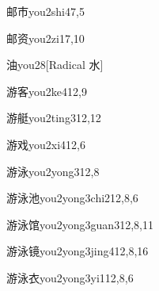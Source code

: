 \begin{verbete}{邮市}{you2shi4}{7,5}
\end{verbete}

\begin{verbete}{邮资}{you2zi1}{7,10}
\end{verbete}

\begin{verbete}{油}{you2}{8}[Radical 水]
\end{verbete}

\begin{verbete}{游客}{you2ke4}{12,9}
\end{verbete}

\begin{verbete}{游艇}{you2ting3}{12,12}
\end{verbete}

\begin{verbete}{游戏}{you2xi4}{12,6}
\end{verbete}

\begin{verbete}{游泳}{you2yong3}{12,8}
\end{verbete}

\begin{verbete}{游泳池}{you2yong3chi2}{12,8,6}
\end{verbete}

\begin{verbete}{游泳馆}{you2yong3guan3}{12,8,11}
\end{verbete}

\begin{verbete}{游泳镜}{you2yong3jing4}{12,8,16}
\end{verbete}

\begin{verbete}{游泳衣}{you2yong3yi1}{12,8,6}
\end{verbete}

